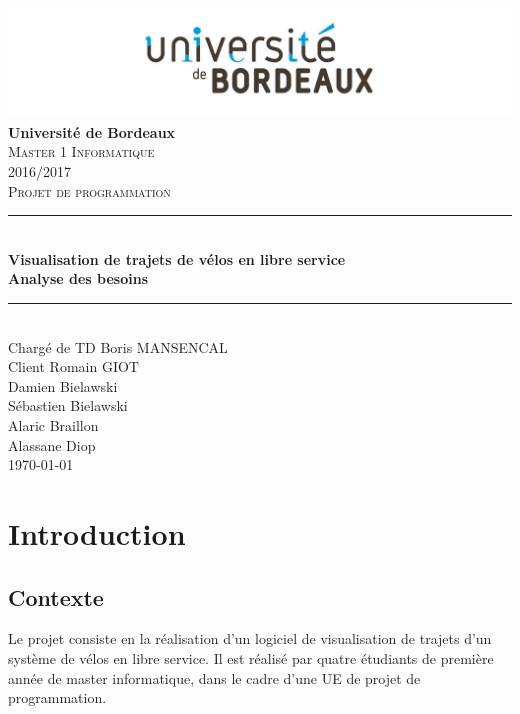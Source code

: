 \documentclass[12pt]{article}
\begin{document}
	\begin{titlepage}
		\includegraphics[scale=0.2]{logo_bordeaux.png}\\
		\centering
		{\LARGE \bfseries Université de Bordeaux}\\ [2cm]
		\textsc{\Large Master 1 Informatique}\\ [0,3cm]
		\textsc{\Large 2016/2017}\\ [1,5cm]

		\textsc{\Large Projet de programmation}\\ [1.5cm]


		\rule{16cm}{1mm}\\ [0,7cm]
		{ \huge \bfseries Visualisation de trajets de vélos en libre service} \\[0,5cm]
		{ \huge \bfseries Analyse des besoins}\\ [0,7cm]
		\rule{16cm}{1mm}\\ [1cm]

		{\Large Chargé de TD Boris MANSENCAL }\\ [0,3cm]
		{\Large Client Romain GIOT }\\ [1cm]

		{\Large Damien Bielawski }\\ [0,3cm]
		{\Large Sébastien Bielawski }\\[0,3cm]
		{\Large Alaric Braillon }\\ [0,3cm]
		{\Large Alassane Diop }\\ [2cm]
		\Large\today

	\end{titlepage}

	\tableofcontents \newpage

	\section{Introduction}
		\subsection{Contexte}
			Le projet consiste en la réalisation d’un logiciel de visualisation de trajets d'un système de vélos en libre service. 
			Il est réalisé par quatre étudiants de première année de master informatique, dans le cadre d'une UE de projet de programmation.
\end{document}
